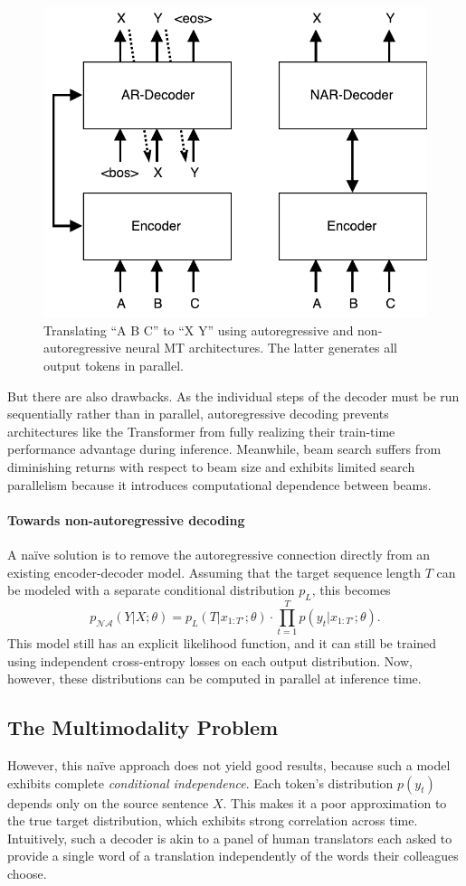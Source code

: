 \begin{figure}
\centering
\includegraphics[width=0.55\linewidth]{figs/nat/ar_nmt}
\caption{\label{fig.ar_vs_nar} Translating ``A B C'' to ``X Y'' using autoregressive and non-autoregressive neural MT architectures. The latter generates all output tokens in parallel.}\vspace{-20pt}
\end{figure}

But there are also drawbacks. As the individual steps of the decoder must be run sequentially rather than in parallel, autoregressive decoding prevents architectures like the Transformer from fully realizing their train-time performance advantage during inference. Meanwhile, beam search suffers from diminishing returns with respect to beam size \citep{koehn2017six} and exhibits limited search parallelism because it introduces computational dependence between beams.

\vspace{-5pt}
\paragraph{Towards non-autoregressive decoding}
A na\"{i}ve solution is to remove the autoregressive connection directly from an existing encoder-decoder model. Assuming that the target sequence length $T$ can be modeled with a separate conditional distribution $p_L$, this becomes
\begin{equation}
p_{\mathcal{NA}}(Y|X; \theta) = p_L(T|x_{1:T'};\theta)\cdot \prod_{t=1}^T p(y_t| x_{1:T'};\theta).
\label{eq.simple}
\end{equation}
This model still has an explicit likelihood function, and it can still be trained using independent cross-entropy losses on each output distribution. Now, however, these distributions can be computed in parallel at inference time. 

\subsection{The Multimodality Problem}
However, this na\"{i}ve approach does not yield good results, because such a model exhibits complete \emph{conditional independence}.
Each token's distribution $p(y_t)$  depends only on the source sentence $X$. 
This makes it a poor approximation to the true target distribution, which exhibits strong correlation across time. 
Intuitively, such a decoder is akin to a panel of human translators each asked to provide a single word of a translation independently of the words their colleagues choose.

